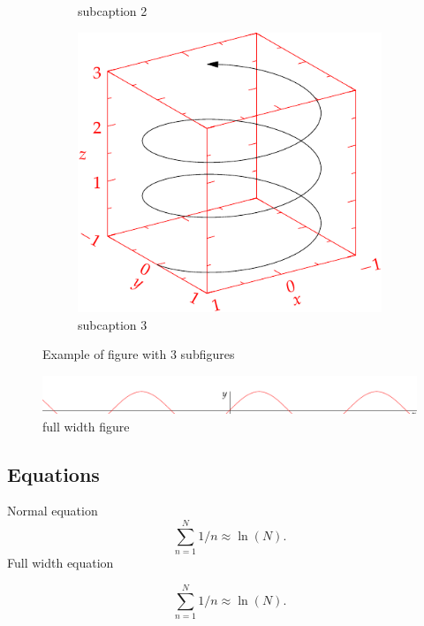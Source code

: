 \begin{figure}
\begin{subfigure}[b]{0.3\textwidth}
            \caption{subcaption 2}
            \label{fig:2}
        \end{subfigure}
        \hfill
        \begin{subfigure}[b]{0.3\textwidth}
            \centering
            \includegraphics[width=\textwidth]{images/helix.pdf}
            \caption{subcaption 3}
            \label{fig:3}
        \end{subfigure}
        \caption{Example of figure with 3 subfigures}
        \label{fig:three_figs}
    \end{figure}

    \begin{figure}[h]
        \includegraphics[width=\linewidth]{images/sine.pdf}%
        \caption{full width figure}%
        \label{app:fig:full_fig}%
    \end{figure}

    \subsection{Equations} %
    \label{sub:equations}

        Normal equation
        \begin{equation}
        \label{eq:normal}
            \sum_{n=1}^{N} 1 / n \approx \ln(N).
        \end{equation}
        Full width equation
        \begin{fullwidth}
            \begin{equation}
            \label{eq:full_width}
                \sum_{n=1}^{N} 1 / n \approx \ln(N).
            \end{equation}
        \end{fullwidth}

